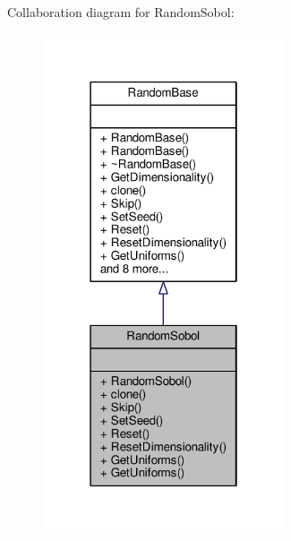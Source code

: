 Collaboration diagram for Random\+Sobol\+:
\nopagebreak
\begin{figure}[H]
\begin{center}
\leavevmode
\includegraphics[width=202pt]{classRandomSobol__coll__graph}
\end{center}
\end{figure}
